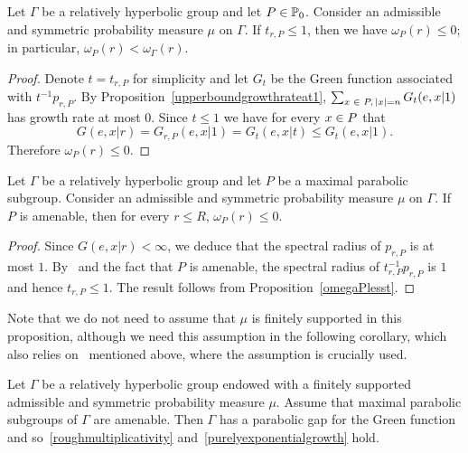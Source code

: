 \documentclass[AHL,Unicode,longabstracts]{cedram}
\newcommand{\bbP}{\mathbb{P}}
\let\oldin\in
\renewcommand{\in}{\mathchoice{\oldin}{\oldin}{\,\oldin\,}{\,\oldin\,}}
\begin{document}
\begin{prop}\label{omegaPlesst}
Let $\Gamma$ be a relatively hyperbolic group and let $P\in \bbP_0$. Consider an admissible and symmetric probability measure $\mu$ on $\Gamma$. If $t_{r, P} \leq 1$, then we have $\omega_P(r) \leq 0$; in particular, $\omega_P(r) < \omega_{\Gamma}(r)$.
\end{prop}

\begin{proof}
Denote $t = t_{r, P}$ for simplicity and let $G_t$ be the Green function associated with $t^{-1} p_{r, P}$. By Proposition~\ref{upperboundgrowthrateat1}, $\sum_{x \in P, \, |x| = n} G_t(e, x | 1)$ has growth rate at most 0. Since $t \leq 1$ we have for every $x\in P$ that
\[
G(e, x | r) = G_{r, P}(e, x | 1) = G_t(e, x | t) \leq G_t(e, x | 1).
\]
Therefore $\omega_P(r) \leq 0$.
\end{proof}

\begin{prop}\label{propamenableparabolic}
Let $\Gamma$ be a relatively hyperbolic group and let $P$ be a maximal parabolic subgroup. Consider an admissible and symmetric probability measure $\mu$ on $\Gamma$. If $P$ is amenable, then for every $r\leq R$, $\omega_P(r)\leq 0$.
\end{prop}



\begin{proof}
Since $G(e, x | r) < \infty$, we deduce that the spectral radius of $p_{r, P}$ is at most $1$. By~\cite[Corollary~12.5]{Woessbook} and the fact that $P$ is amenable, the spectral radius of $t_{r, P}^{-1} p_{r, P}$ is $1$ and hence $t_{r, P} \leq 1$. The result follows from Proposition~\ref{omegaPlesst}.
\end{proof}

Note that we do not need to assume that $\mu$ is finitely supported in this proposition, although we need this assumption in the following corollary, which also relies on~\cite[Theorem~1.8]{DWY} mentioned above, where the assumption is crucially used.

\begin{coro}\label{coramenableparabolic}
Let $\Gamma$ be a relatively hyperbolic group endowed with a finitely supported admissible and symmetric probability measure $\mu$. Assume that maximal parabolic subgroups of $\Gamma$ are amenable. Then $\Gamma$ has a parabolic gap for the Green function and so~\eqref{roughmultiplicativity} and~\eqref{purelyexponentialgrowth} hold.
\end{coro}
\end{document}
